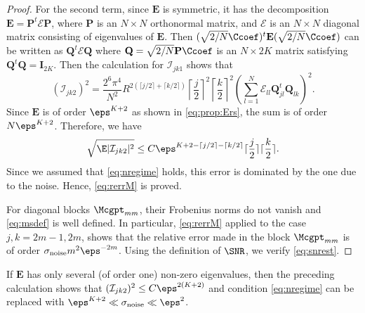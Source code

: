 \begin{proof}
For the second term, since $\mathbf{E}$ is symmetric, it has the
decomposition $\mathbf{E} = \mathbf{P}^t \mathcal{E} \mathbf{P}$,
where $\mathbf{P}$ is an $N \times N$ orthonormal matrix, and
$\mathcal{E}$ is an $N \times N$ diagonal matrix consisting of
eigenvalues of $\mathbf{E}$. Then $(\sqrt{2/N}\Ccoef)^t \mathbf{E}
(\sqrt{2/N}\Ccoef)$ can be written as $\mathbf{Q}^t \mathcal{E}
\mathbf{Q}$ where $\mathbf{Q} = \sqrt{2/N} \mathbf{P} \Ccoef$ is
an $N \times 2K$ matrix satisfying $\mathbf{Q}^t \mathbf{Q} =
\mathbf{I}_{2K}$. Then the calculation for $\mathcal{I}_{jk1}$
shows that
\begin{equation*}
(\mathcal{I}_{jk2})^2  = \frac{2^6\pi^4}{N^2} R^{2(\lceil j/2
\rceil + \lceil k/2 \rceil)} \left\lceil \frac{j}{2} \right
\rceil^2 \left\lceil \frac{k}{2} \right\rceil^2 \left(\sum_{l=1}^N
\mathcal{E}_{ll} \mathbf{Q}^t_{jl} \mathbf{Q}_{lk} \right)^2.
\end{equation*}
Since $\mathbf{E}$ is of order $\eps^{K+2}$ as shown in
\eqref{eq:prop:Ers}, the sum is of order $N\eps^{K+2}$. Therefore,
we have
$$\sqrt{\E |\mathcal{I}_{jk2}|^2} \le C\eps^{K+2 -\lceil j/2 \rceil
- \lceil k/2 \rceil} \lceil \frac{j}{2}\rceil \lceil \frac{k}{2}
\rceil .$$ Since we assumed that \eqref{eq:nregime} holds, this
error is dominated by the one due to the noise. Hence,
\eqref{eq:rerrM} is proved.

For diagonal blocks $\Mcgpt_{mm}$, their Frobenius norms do not
vanish and \eqref{eq:msdef} is well defined. In particular,
\eqref{eq:rerrM} applied to the case $j,k = 2m-1, 2m$, shows that
the relative error made in the block $\Mcgpt_{mm}$ is of order
$\sigma_{\mathrm{noise}} m^2 \eps^{-2m}$. Using the definition of
$\SNR$, we verify \eqref{eq:snrest}.
\end{proof}

\begin{remark} \label{rem:whyN}
If $\mathbf{E}$ has only several (of order one) non-zero
eigenvalues, then the preceding calculation shows that
$(\mathcal{I}_{jk2})^2 \le C\eps^{2(K+2)}$ and condition
\eqref{eq:nregime} can be replaced with $\eps^{K+2} \ll
\sigma_{\mathrm{noise}} \ll \eps^2$.
\end{remark}

